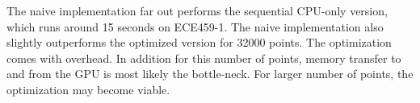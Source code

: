 \documentclass[12pt]{article}
\begin{document}
The naive implementation far out performs the sequential CPU-only
version, which runs around 15 seconds on ECE459-1. The naive
implementation also slightly outperforms the optimized version for
32000 points. The optimization comes with overhead. In addition for
this number of points, memory transfer to and from the GPU is most
likely the bottle-neck. For larger number of points, the optimization
may become viable.
\end{document}
